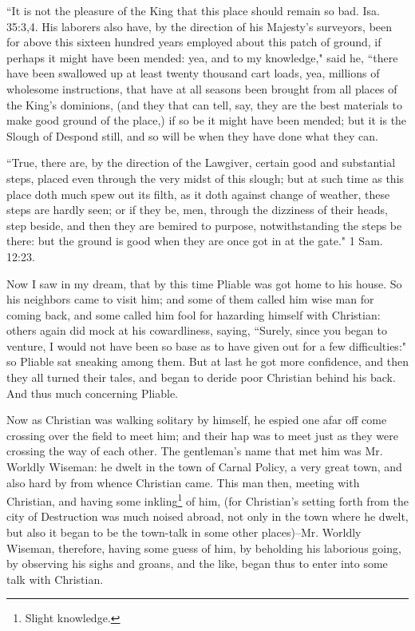 ``It is not the pleasure of the King that this place should remain so bad. Isa. 35:3,4. His laborers also have, by the direction of his Majesty's surveyors, been for above this sixteen hundred years employed about this patch of ground, if perhaps it might have been mended: yea, and to my knowledge," said he, ``there have been swallowed up at least twenty thousand cart loads, yea, millions of wholesome instructions, that have at all seasons been brought from all places of the King's dominions, (and they that can tell, say, they are the best materials to make good ground of the place,) if so be it might have been mended; but it is the Slough of Despond still, and so will be when they have done what they can. 

``True, there are, by the direction of the Lawgiver, certain good and substantial steps, placed even through the very midst of this slough; but at such time as this place doth much spew out its filth, as it doth against change of weather, these steps are hardly seen; or if they be, men, through the dizziness of their heads, step beside, and then they are bemired to purpose, notwithstanding the steps be there: but the ground is good when they are once got in at the gate." 1 Sam. 12:23. 

Now I saw in my dream, that by this time Pliable was got home to his house. So his neighbors came to visit him; and some of them called him wise man for coming back, and some called him fool for hazarding himself with Christian: others again did mock at his cowardliness, saying, ``Surely, since you began to venture, I would not have been so base as to have given out for a few difficulties:" so Pliable sat sneaking among them. But at last he got more confidence, and then they all turned their tales, and began to deride poor Christian behind his back. And thus much concerning Pliable. 

Now as Christian was walking solitary by himself, he espied one afar off come crossing over the field to meet him; and their hap was to meet just as they were crossing the way of each other. The gentleman's name that met him was Mr. Worldly Wiseman: he dwelt in the town of Carnal Policy, a very great town, and also hard by from whence Christian came. This man then, meeting with Christian, and having some inkling\footnote{Slight knowledge.} of him, (for Christian's setting forth from the city of Destruction was much noised abroad, not only in the town where he dwelt, but also it began to be the town-talk in some other places)--Mr. Worldly Wiseman, therefore, having some guess of him, by beholding his laborious going, by observing his sighs and groans, and the like, began thus to enter into some talk with Christian. 

